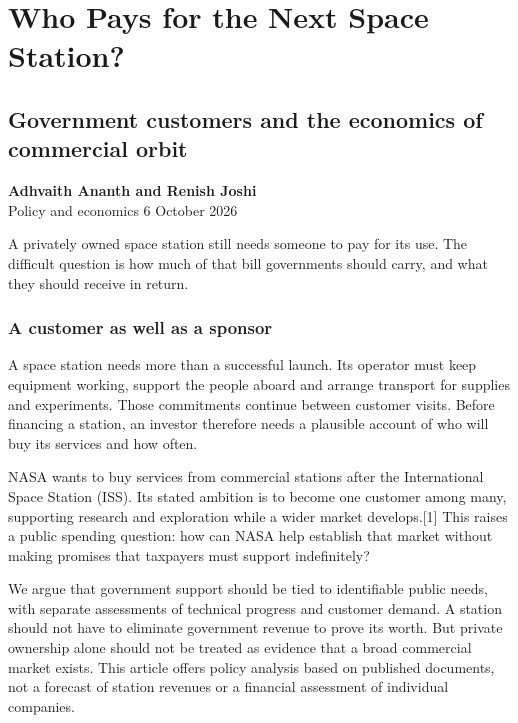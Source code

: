 \documentclass[11pt,letterpaper]{article}
\begin{document}
\hypertarget{who-pays-for-the-next-space-station}{%
\section{Who Pays for the Next Space
Station?}\label{who-pays-for-the-next-space-station}}

\hypertarget{government-customers-and-the-economics-of-commercial-orbit}{%
\subsection{Government customers and the economics of commercial
orbit}\label{government-customers-and-the-economics-of-commercial-orbit}}

\textbf{Adhvaith Ananth and Renish Joshi}\\
Policy and economics \textbar{} 6 October 2026

A privately owned space station still needs someone to pay for its use.
The difficult question is how much of that bill governments should
carry, and what they should receive in return.

\hypertarget{a-customer-as-well-as-a-sponsor}{%
\subsubsection{A customer as well as a
sponsor}\label{a-customer-as-well-as-a-sponsor}}

A space station needs more than a successful launch. Its operator must
keep equipment working, support the people aboard and arrange transport
for supplies and experiments. Those commitments continue between
customer visits. Before financing a station, an investor therefore needs
a plausible account of who will buy its services and how often.

NASA wants to buy services from commercial stations after the
International Space Station (ISS). Its stated ambition is to become one
customer among many, supporting research and exploration while a wider
market develops.{[}1{]} This raises a public spending question: how can
NASA help establish that market without making promises that taxpayers
must support indefinitely?

We argue that government support should be tied to identifiable public
needs, with separate assessments of technical progress and customer
demand. A station should not have to eliminate government revenue to
prove its worth. But private ownership alone should not be treated as
evidence that a broad commercial market exists. This article offers
policy analysis based on published documents, not a forecast of station
revenues or a financial assessment of individual companies.
\end{document}
